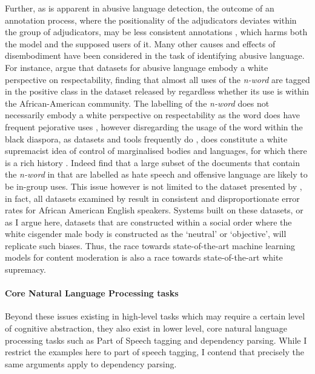 {Further, as is apparent in abusive language detection, the outcome of an annotation process, where the positionality of the adjudicators deviates within the group of adjudicators, may be less consistent annotations \citep{Waseem:2016}, which harms both the model and the supposed users of it.
Many other causes and effects of disembodiment have been considered in the task of identifying abusive language.
For instance, \citet{Waseem:2018} argue that datasets for abusive language embody a white perspective on respectability, finding that almost all uses of the \textit{n-word} are tagged in the positive class in the dataset released by \citet{Davidson:2017} regardless whether its use is within the African-American community.
The labelling of the \textit{n-word} does not necessarily embody a white perspective on respectability as the word does have frequent pejorative uses \citep{Croom:2013}, however disregarding the usage of the word within the black diaspora, as datasets and tools frequently do \citep{Davidson:2019}, does constitute a white supremacist idea of control of marginalised bodies and languages, for which there is a rich history \citep{Craft:2020}.
Indeed \citet{Waseem:2018} find that a large subset of the documents that contain the \textit{n-word} in \citet{Davidson:2017} that are labelled as hate speech and offensive language are likely to be in-group uses.
This issue however is not limited to the dataset presented by \citet{Davidson:2017}, in fact, all datasets examined by \citet{Davidson:2019} result in consistent and disproportionate error rates for African American English speakers.
Systems built on these datasets, or as I argue here, datasets that are constructed within a social order where the white cisgender male body is constructed as the `neutral' or `objective', will replicate such biases.
Thus, the race towards state-of-the-art machine learning models for content moderation is also a race towards state-of-the-art white supremacy.

\paragraph{Core Natural Language Processing tasks}
Beyond these issues existing in high-level tasks which may require a certain level of cognitive abstraction, they also exist in lower level, core natural language processing tasks such as Part of Speech tagging and dependency parsing.
While I restrict the examples here to part of speech tagging, I contend that precisely the same arguments apply to dependency parsing.

}
